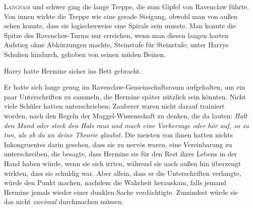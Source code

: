 
\lettrine{L}{angsam} und schwer ging die lange Treppe, die zum Gipfel von Ravenclaw führte. Von innen wirkte die Treppe wie eine gerade Steigung, obwohl man von außen sehen konnte, dass sie logischerweise eine Spirale sein musste. Man konnte die Spitze des Ravenclaw-Turms nur erreichen, wenn man diesen langen harten Aufstieg ohne Abkürzungen machte, Steinstufe für Steinstufe; unter Harrys Schuhen hindurch, gehoben von seinen müden Beinen.

Harry hatte Hermine sicher ins Bett gebracht.

Er hatte sich lange genug im Ravenclaw-Gemeinschaftsraum aufgehalten, um ein paar Unterschriften zu sammeln, die Hermine später nützlich sein könnten. Nicht viele Schüler hatten unterschrieben; Zauberer waren nicht darauf trainiert worden, nach den Regeln der Muggel-Wissenschaft zu denken, die da lauten: \emph{Halt den Mund oder steck den Hals raus und mach eine Vorhersage oder hör auf, so zu tun, als ob du an deine Theorie glaubst.} Die meisten von ihnen hatten nichts Inkongruentes darin gesehen, dass sie zu nervös waren, eine Vereinbarung zu unterschreiben, die besagte, dass Hermine sie für den Rest ihres Lebens in der Hand haben würde, wenn sie sich irrten, während sie nach außen hin überzeugt wirkten, dass sie schuldig war. Aber allein, dass er die Unterschriften verlangte, würde den Punkt machen, nachdem die Wahrheit herauskam, falls jemand Hermine jemals wieder einer dunklen Sache verdächtigte. Zumindest würde sie das nicht \emph{zweimal} durchmachen müssen.

